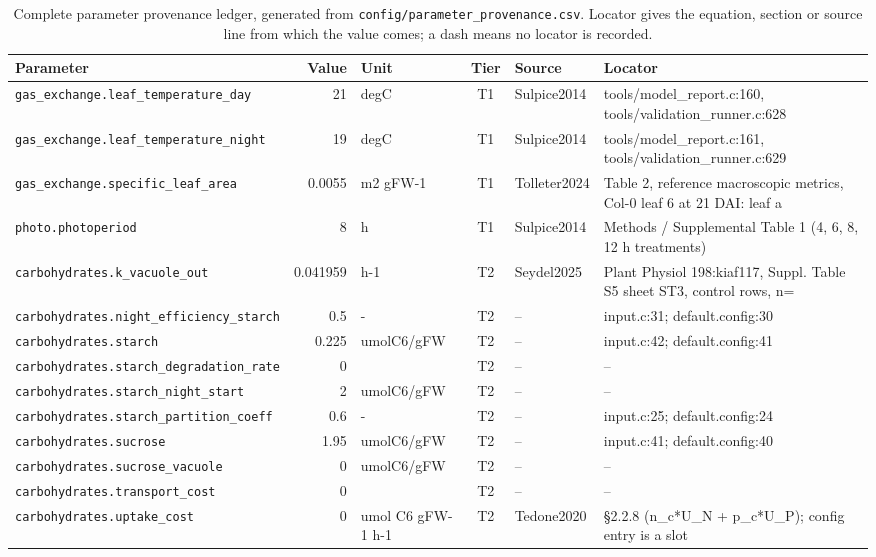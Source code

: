 \begin{table}[!htbp]
\centering
\tiny
\caption{Complete parameter provenance ledger, generated from
\texttt{config/parameter\_provenance.csv}. Locator gives the equation, section or
source line from which the value comes; a dash means no locator is recorded.}
\label{tab:provenance}
\begin{tabular}{@{}p{52mm}rp{20mm}cp{20mm}p{38mm}@{}}
\toprule
Parameter & Value & Unit & Tier & Source & Locator \\
\midrule
\texttt{gas\_exchange.leaf\_temperature\_day} & 21 & degC & T1 & Sulpice2014 & tools/model\_report.c:160, tools/validation\_runner.c:628 \\
\texttt{gas\_exchange.leaf\_temperature\_night} & 19 & degC & T1 & Sulpice2014 & tools/model\_report.c:161, tools/validation\_runner.c:629 \\
\texttt{gas\_exchange.specific\_leaf\_area} & 0.0055 & m2 gFW-1 & T1 & Tolleter2024 & Table 2, reference macroscopic metrics, Col-0 leaf 6 at 21 DAI: leaf a \\
\texttt{photo.photoperiod} & 8 & h & T1 & Sulpice2014 & Methods / Supplemental Table 1 (4, 6, 8, 12 h treatments) \\
\texttt{carbohydrates.k\_vacuole\_out} & 0.041959 & h-1 & T2 & Seydel2025 & Plant Physiol 198:kiaf117, Suppl. Table S5 sheet ST3, control rows, n= \\
\texttt{carbohydrates.night\_efficiency\_starch} & 0.5 & - & T2 & -- & input.c:31; default.config:30 \\
\texttt{carbohydrates.starch} & 0.225 & umolC6/gFW & T2 & -- & input.c:42; default.config:41 \\
\texttt{carbohydrates.starch\_degradation\_rate} & 0 &  & T2 & -- & -- \\
\texttt{carbohydrates.starch\_night\_start} & 2 & umolC6/gFW & T2 & -- & -- \\
\texttt{carbohydrates.starch\_partition\_coeff} & 0.6 & - & T2 & -- & input.c:25; default.config:24 \\
\texttt{carbohydrates.sucrose} & 1.95 & umolC6/gFW & T2 & -- & input.c:41; default.config:40 \\
\texttt{carbohydrates.sucrose\_vacuole} & 0 & umolC6/gFW & T2 & -- & -- \\
\texttt{carbohydrates.transport\_cost} & 0 &  & T2 & -- & -- \\
\texttt{carbohydrates.uptake\_cost} & 0 & umol C6 gFW-1 h-1 & T2 & Tedone2020 & §2.2.8 (n\_c*U\_N + p\_c*U\_P); config entry is a slot \\

\end{tabular}
\end{table}
